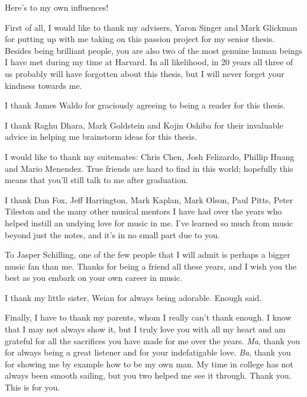 
Here's to my own influences!

First of all, I would like to thank my advisers, Yaron Singer and Mark Glickman for putting up with me taking on this passion project for my senior thesis. Besides being brilliant people, you are also two of the most genuine human beings I have met during my time at Harvard. In all likelihood, in 20 years all three of us probably will have forgotten about this thesis, but I will never forget your kindness towards me.

I thank James Waldo for graciously agreeing to being a reader for this thesis.

I thank Raghu Dhara, Mark Goldstein and Kojin Oshiba for their invaluable advice in helping me brainstorm ideas for this thesis.

I would like to thank my suitemates: Chris Chen, Josh Felizardo, Phillip Huang and Mario Menendez. True friends are hard to find in this world; hopefully this means that you'll still talk to me after graduation.

I thank Dan Fox, Jeff Harrington, Mark Kaplan, Mark Olson, Paul Pitts, Peter Tileston and the many other musical mentors I have had over the years who helped instill an undying love for music in me. I've learned so much from music beyond just the notes, and it's in no small part due to you.

To Jasper Schilling, one of the few people that I will admit is perhaps a bigger music fan than me. Thanks for being a friend all these years, and I wish you the best as you embark on your own career in music.

I thank my little sister, Weian for always being adorable. Enough said.

Finally, I have to thank my parents, whom I really can't thank enough. I know that I may not always show it, but I truly love you with all my heart and am grateful for all the sacrifices you have made for me over the years. \textit{Ma}, thank you for always being a great listener and for your indefatigable love. \textit{Ba}, thank you for showing me by example how to be my own man. My time in college has not always been smooth sailing, but you two helped me see it through. Thank you. This is for you.




